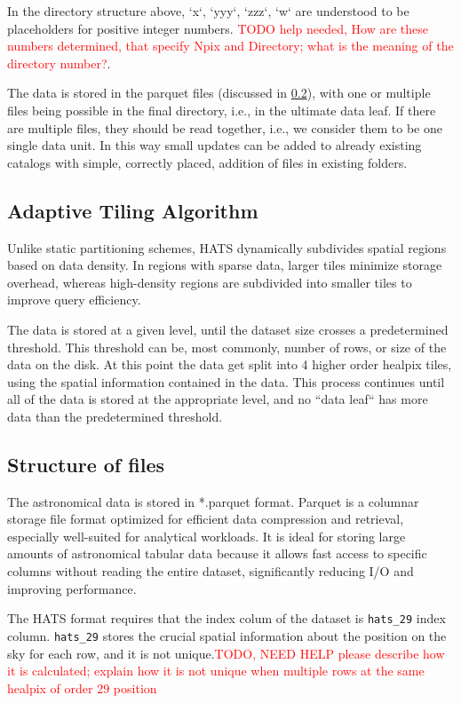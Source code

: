 \documentclass[11pt,a4paper]{ivoa}
\begin{document}
In the directory structure above, `x`, `yyy`, `zzz`, `w` are understood to be placeholders for positive integer numbers. \textcolor{red}{TODO help needed, How are these numbers determined, that specify Npix and Directory; what is the meaning of the directory number?}. \par
The data is stored in the parquet files (discussed in \ref{sec:parquet}), with one or multiple files being possible in the final directory, i.e., in the ultimate data leaf. If there are multiple files, they should be read together, i.e., we consider them to be one single data unit. In this way small updates can be added to already existing catalogs with simple, correctly placed, addition of files in existing folders.

    \subsection{Adaptive Tiling Algorithm} \label{sec:adaptive}
    Unlike static partitioning schemes, HATS dynamically subdivides spatial regions based on data density. In regions with sparse data, larger tiles minimize storage overhead, whereas high-density regions are subdivided into smaller tiles to improve query efficiency. \par
    The data is stored at a given level, until the dataset size crosses a predetermined threshold. This threshold can be, most commonly,  number of rows, or size of the data on the disk. At this point the data get split into 4 higher order healpix tiles, using the spatial information contained in the data. This process continues until all of the data is stored at the appropriate level, and no ``data leaf`` has more data than the predetermined threshold.

     \subsection{Structure of files} \label{sec:parquet}
The astronomical data is stored in *.parquet format. Parquet is a columnar storage file format optimized for efficient data compression and retrieval, especially well-suited for analytical workloads. It is ideal for storing large amounts of astronomical tabular data because it allows fast access to specific columns without reading the entire dataset, significantly reducing I/O and improving performance. \par
The HATS format requires that the index colum of the dataset is \texttt{hats\_29} index column.  \texttt{hats\_29} stores the crucial spatial information about the position on the sky for each row, and it is not unique.\textcolor{red}{TODO, NEED HELP please describe how it is calculated; explain how it is not unique when multiple rows at the same healpix of order 29 position} 
\end{document}
